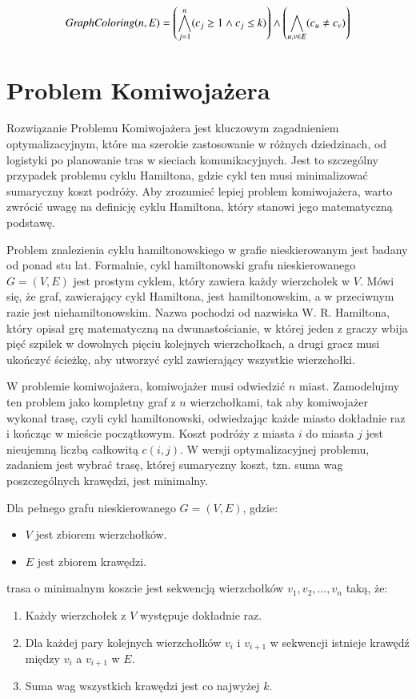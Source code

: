 \begin{align*}
	{\mathit{GraphColoring}}(n, E) = \left( \bigwedge_{j=1}^{n} (c_j \geq 1 \land c_j \leq k) \right) \land 
	\left( \bigwedge_{u, v \in E} (c_u \neq c_v) \right)
\end{align*}


\section{Problem Komiwojażera}
Rozwiązanie Problemu Komiwojażera jest kluczowym zagadnieniem optymalizacyjnym, które ma szerokie zastosowanie w różnych dziedzinach, od logistyki po planowanie tras w sieciach komunikacyjnych. Jest to szczególny przypadek problemu cyklu Hamiltona, gdzie cykl ten musi minimalizować sumaryczny koszt podróży. Aby zrozumieć lepiej problem komiwojażera, warto zwrócić uwagę na definicję cyklu Hamiltona, który stanowi jego matematyczną podstawę.

Problem znalezienia cyklu hamiltonowskiego w grafie nieskierowanym jest badany od ponad stu lat. Formalnie, cykl hamiltonowski grafu nieskierowanego $G = (V, E)$ jest prostym cyklem, który zawiera każdy wierzchołek w \(V\). Mówi się, że graf, zawierający cykl Hamiltona, jest hamiltonowskim, a w przeciwnym razie jest niehamiltonowskim. Nazwa pochodzi od nazwiska W. R. Hamiltona, który opisał grę matematyczną na dwunastościanie, w której jeden z graczy wbija pięć szpilek w dowolnych pięciu kolejnych wierzchołkach, a drugi gracz musi ukończyć ścieżkę, aby utworzyć cykl zawierający wszystkie wierzchołki.

W problemie komiwojażera, komiwojażer musi odwiedzić \(n\) miast. Zamodelujmy ten problem jako kompletny graf z \(n\) wierzchołkami, tak aby komiwojażer wykonał trasę, czyli cykl hamiltonowski, odwiedzając każde miasto dokładnie raz i kończąc w mieście początkowym. Koszt podróży z miasta \(i\) do miasta \(j\) jest nieujemną liczbą całkowitą \(c(i, j)\). W wersji optymalizacyjnej problemu, zadaniem jest wybrać trasę, której sumaryczny koszt, tzn. suma wag poszczególnych krawędzi, jest minimalny.

Dla pełnego grafu nieskierowanego $G = (V, E)$, gdzie:
\begin{itemize}
	\item \(V\) jest zbiorem wierzchołków.
	\item \(E\) jest zbiorem krawędzi.
\end{itemize}
trasa o minimalnym koszcie jest sekwencją wierzchołków $v_1, v_2, …, v_n$ taką, że:
\begin{enumerate}
	\item Każdy wierzchołek z \(V\) występuje dokładnie raz.
	\item Dla każdej pary kolejnych wierzchołków \(v_i\) i \(v_{i+1}\) w sekwencji istnieje krawędź między \(v_i\) a \(v_{i+1}\) w \(E\).
	\item Suma wag wszystkich krawędzi jest co najwyżej \(k\).
\end{enumerate}

